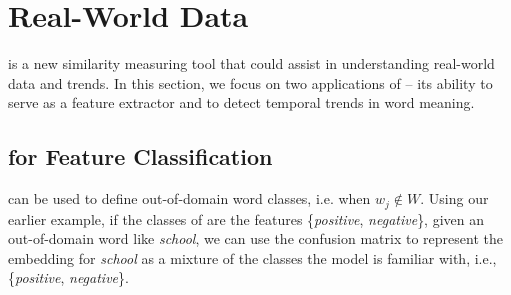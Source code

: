 \section{Real-World Data}
\label{sec:domain_spec}

\wc is a new similarity measuring tool that could assist in understanding real-world data and trends. In this section, we focus on two applications of {\wc} -- its ability to serve as a feature extractor and to detect temporal trends in word meaning.   

\subsection{\wc for Feature Classification}
\label{sec:validation_experiments}

\begin{table*}[h!]
    \centering
    \caption{Macro-F1 for \wc and cosine similarity across a variety of feature classification tasks. We operationalize cosine similarity in three ways: 1) the distance between the centroids of the seed words and the target words 2) the average distance each of the target word to the centroid of the seed words 3) the average distance of each target word to each seed word (no centroids).}
    \label{tab:results}
\end{table*}


\wc can be used to define out-of-domain word classes, i.e. when $w_j \not\in W$. Using our earlier example, if the classes of \wc are the features \{\textit{positive}, \textit{negative}\}, given an out-of-domain word like \textit{school}, we can use the confusion matrix to represent the embedding for \textit{school} as a mixture of the classes the model is familiar with, i.e., \{\textit{positive}, \textit{negative}\}.

